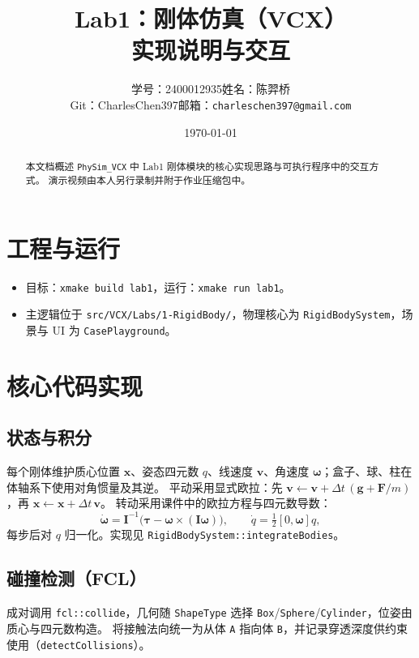 \documentclass[UTF8,a4paper,11pt]{ctexart}
\title{Lab1：刚体仿真（VCX）\\实现说明与交互}
\author{%
  学号：2400012935\quad 姓名：陈羿桥\\[0.35em]
  \small Git：CharlesChen397\quad 邮箱：\texttt{charleschen397@gmail.com}%
}
\date{\today}
\begin{document}
\maketitle

\begin{abstract}
\noindent
本文档概述 \texttt{PhySim\_VCX} 中 Lab1 刚体模块的核心实现思路与可执行程序中的交互方式。
演示视频由本人另行录制并附于作业压缩包中。
\end{abstract}

\section{工程与运行}
\begin{itemize}[leftmargin=*]
  \item 目标：\texttt{xmake build lab1}，运行：\texttt{xmake run lab1}。
  \item 主逻辑位于 \texttt{src/VCX/Labs/1-RigidBody/}，物理核心为 \texttt{RigidBodySystem}，场景与 UI 为 \texttt{CasePlayground}。
\end{itemize}

\section{核心代码实现}

\subsection{状态与积分}
每个刚体维护质心位置 $\mathbf{x}$、姿态四元数 $q$、线速度 $\mathbf{v}$、角速度 $\boldsymbol{\omega}$；盒子、球、柱在体轴系下使用对角惯量及其逆。
平动采用显式欧拉：先 $\mathbf{v}\leftarrow\mathbf{v}+\Delta t\,( \mathbf{g}+\mathbf{F}/m)$，再 $\mathbf{x}\leftarrow\mathbf{x}+\Delta t\,\mathbf{v}$。
转动采用课件中的欧拉方程与四元数导数：
\[
\dot{\boldsymbol{\omega}} = \mathbf{I}^{-1}\bigl(\boldsymbol{\tau}-\boldsymbol{\omega}\times(\mathbf{I}\boldsymbol{\omega})\bigr),\qquad
\dot{q}=\tfrac{1}{2}[0,\boldsymbol{\omega}]q,
\]
每步后对 $q$ 归一化。实现见 \texttt{RigidBodySystem::integrateBodies}。

\subsection{碰撞检测（FCL）}
成对调用 \texttt{fcl::collide}，几何随 \texttt{ShapeType} 选择 \texttt{Box}/\texttt{Sphere}/\texttt{Cylinder}，位姿由质心与四元数构造。
将接触法向统一为从体 \texttt{A} 指向体 \texttt{B}，并记录穿透深度供约束使用（\texttt{detectCollisions}）。
\end{document}
